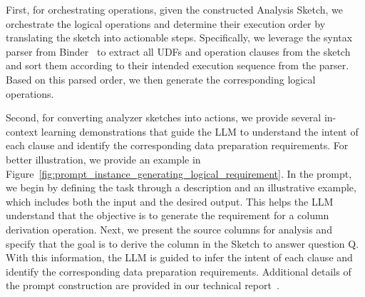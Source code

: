 First, for orchestrating operations, given the constructed Analysis Sketch, we orchestrate the logical operations and determine their execution order by translating the sketch into actionable steps.
Specifically, we leverage the syntax parser from Binder~\cite{cheng2023binding} to extract all UDFs and operation clauses from the sketch and sort them according to their intended execution sequence from the parser.
Based on this parsed order, we then generate the corresponding logical operations.






Second, for converting analyzer sketches into actions, we provide several in-context learning demonstrations that guide the LLM to understand the intent of each clause and identify the corresponding data preparation requirements.
%
For better illustration, we provide an example in Figure~\ref{fig:prompt_instance_generating_logical_requirement}. In the prompt, we begin by defining the task through a description and an illustrative example, which includes both the input and the desired output. This helps the LLM understand that the objective is to generate the requirement for a column derivation operation. Next, we present the source columns for analysis and specify that the goal is to derive the column  in the Sketch to answer question Q. With this information, the LLM is guided to infer the intent of each clause and identify the corresponding data preparation requirements. Additional details of the prompt construction are provided in our technical report~\cite{technical_report}.


